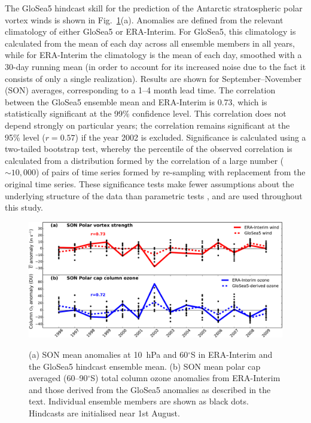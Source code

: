 The GloSea5 hindcast skill for the prediction of the Antarctic stratospheric
polar vortex winds is shown in Fig.\ \ref{fig:zmzw_ozone}(a). Anomalies are
defined from the relevant climatology of either GloSea5 or ERA-Interim. For
GloSea5, this climatology is calculated from the mean of each day across all
ensemble members in all years, while for ERA-Interim the climatology is the mean
of each day, smoothed with a 30-day running mean (in order to account for its
increased noise due to the fact it consists of only a single
realization). Results are shown for September--November (SON) averages,
corresponding to a 1--4 month lead time. The correlation between the GloSea5
ensemble mean and ERA-Interim is 0.73, which is statistically significant at the
99\% confidence level. This correlation does not depend strongly on particular
years; the correlation remains significant at the 95\% level ($r=0.57$) if the
year 2002 is excluded. Significance is calculated using a two-tailed bootstrap
test, whereby the percentile of the observed correlation is calculated from a
distribution formed by the correlation of a large number ($\sim 10,000$) of
pairs of time series formed by re-sampling with replacement from the original
time series. These significance tests make fewer assumptions about the
underlying structure of the data than parametric tests \citep{Wilks}, and are
used throughout this study.

\begin{figure}[t]
  \noindent\includegraphics[width=\textwidth,angle=0]{figures/chapter-seasonal/zmzw_ozone_crop.pdf}\\
  \caption[GloSea5 forecast skill for the stratospheric polar vortex strength
and column ozone.]{(a) SON mean anomalies at 10~hPa and 60$^{\circ}$S in
ERA-Interim and the GloSea5 hindcast ensemble mean. (b) SON mean polar cap
averaged (60--90$^{\circ}$S) total column ozone anomalies from ERA-Interim and
those derived from the GloSea5 anomalies as described in the text. Individual
ensemble members are shown as black dots. Hindcasts are initialised near 1st
August.}\label{fig:zmzw_ozone}
\end{figure}

